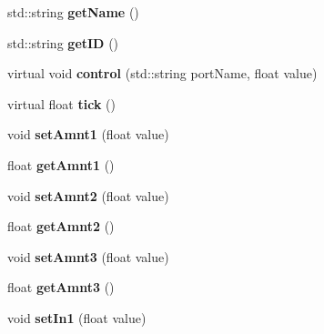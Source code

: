 \begin{DoxyCompactItemize}
\item 
std\+::string {\bfseries get\+Name} ()\hypertarget{classunit_1_1UGen_adfb82e003597ca4876f803f0395b28d6}{}\label{classunit_1_1UGen_adfb82e003597ca4876f803f0395b28d6}

\item 
std\+::string {\bfseries get\+ID} ()\hypertarget{classunit_1_1UGen_a500ba300703167f4daa52b51841edf24}{}\label{classunit_1_1UGen_a500ba300703167f4daa52b51841edf24}

\item 
virtual void {\bfseries control} (std\+::string port\+Name, float value)\hypertarget{classunit_1_1UGen_a456a55e23a073bc77135525be38ad0eb}{}\label{classunit_1_1UGen_a456a55e23a073bc77135525be38ad0eb}

\item 
virtual float {\bfseries tick} ()\hypertarget{classunit_1_1UGen_a7fe124a01b35094197816cb8aa033c55}{}\label{classunit_1_1UGen_a7fe124a01b35094197816cb8aa033c55}

\item 
void {\bfseries set\+Amnt1} (float value)\hypertarget{classunit_1_1UGen_a5063e6854f054cf7870abf1fdcbf8e30}{}\label{classunit_1_1UGen_a5063e6854f054cf7870abf1fdcbf8e30}

\item 
float {\bfseries get\+Amnt1} ()\hypertarget{classunit_1_1UGen_a98614bdc04b7c096fa7a75e486898947}{}\label{classunit_1_1UGen_a98614bdc04b7c096fa7a75e486898947}

\item 
void {\bfseries set\+Amnt2} (float value)\hypertarget{classunit_1_1UGen_a13494a4d13ad1fd32d16d5d22c22fb6d}{}\label{classunit_1_1UGen_a13494a4d13ad1fd32d16d5d22c22fb6d}

\item 
float {\bfseries get\+Amnt2} ()\hypertarget{classunit_1_1UGen_aa051f663b3fd0568eae2cad11b69058c}{}\label{classunit_1_1UGen_aa051f663b3fd0568eae2cad11b69058c}

\item 
void {\bfseries set\+Amnt3} (float value)\hypertarget{classunit_1_1UGen_aad0a3b7250c400216930062d651a1cf4}{}\label{classunit_1_1UGen_aad0a3b7250c400216930062d651a1cf4}

\item 
float {\bfseries get\+Amnt3} ()\hypertarget{classunit_1_1UGen_ac884f3a8cd1886698a9e2745940b9e1a}{}\label{classunit_1_1UGen_ac884f3a8cd1886698a9e2745940b9e1a}

\item 
void {\bfseries set\+In1} (float value)\hypertarget{classunit_1_1UGen_a4c68a850f5a690e39fd3903e52da313a}{}\label{classunit_1_1UGen_a4c68a850f5a690e39fd3903e52da313a}


\end{DoxyCompactItemize}
